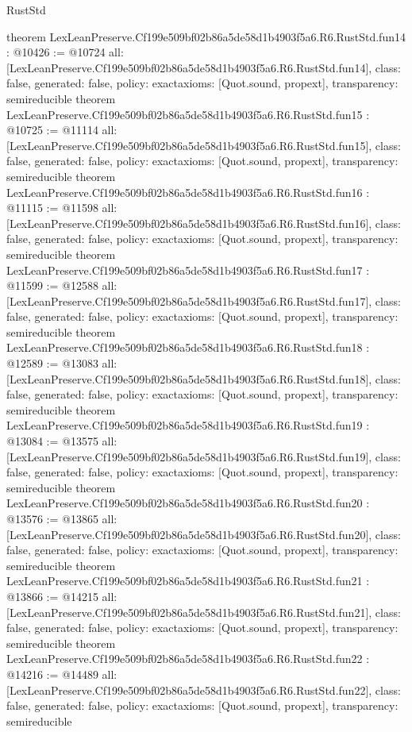 \begin{lexlean}{RustStd}
\begin{coremodule}
{}
theorem LexLeanPreserve.Cf199e509bf02b86a5de58d1b4903f5a6.R6.RustStd.fun14 : @10426 := @10724 {
  all: [LexLeanPreserve.Cf199e509bf02b86a5de58d1b4903f5a6.R6.RustStd.fun14],
  class: false,
  generated: false,
  policy: exact{axioms: [Quot.sound, propext]},
  transparency: semireducible
}
theorem LexLeanPreserve.Cf199e509bf02b86a5de58d1b4903f5a6.R6.RustStd.fun15 : @10725 := @11114 {
  all: [LexLeanPreserve.Cf199e509bf02b86a5de58d1b4903f5a6.R6.RustStd.fun15],
  class: false,
  generated: false,
  policy: exact{axioms: [Quot.sound, propext]},
  transparency: semireducible
}
theorem LexLeanPreserve.Cf199e509bf02b86a5de58d1b4903f5a6.R6.RustStd.fun16 : @11115 := @11598 {
  all: [LexLeanPreserve.Cf199e509bf02b86a5de58d1b4903f5a6.R6.RustStd.fun16],
  class: false,
  generated: false,
  policy: exact{axioms: [Quot.sound, propext]},
  transparency: semireducible
}
theorem LexLeanPreserve.Cf199e509bf02b86a5de58d1b4903f5a6.R6.RustStd.fun17 : @11599 := @12588 {
  all: [LexLeanPreserve.Cf199e509bf02b86a5de58d1b4903f5a6.R6.RustStd.fun17],
  class: false,
  generated: false,
  policy: exact{axioms: [Quot.sound, propext]},
  transparency: semireducible
}
theorem LexLeanPreserve.Cf199e509bf02b86a5de58d1b4903f5a6.R6.RustStd.fun18 : @12589 := @13083 {
  all: [LexLeanPreserve.Cf199e509bf02b86a5de58d1b4903f5a6.R6.RustStd.fun18],
  class: false,
  generated: false,
  policy: exact{axioms: [Quot.sound, propext]},
  transparency: semireducible
}
theorem LexLeanPreserve.Cf199e509bf02b86a5de58d1b4903f5a6.R6.RustStd.fun19 : @13084 := @13575 {
  all: [LexLeanPreserve.Cf199e509bf02b86a5de58d1b4903f5a6.R6.RustStd.fun19],
  class: false,
  generated: false,
  policy: exact{axioms: [Quot.sound, propext]},
  transparency: semireducible
}
theorem LexLeanPreserve.Cf199e509bf02b86a5de58d1b4903f5a6.R6.RustStd.fun20 : @13576 := @13865 {
  all: [LexLeanPreserve.Cf199e509bf02b86a5de58d1b4903f5a6.R6.RustStd.fun20],
  class: false,
  generated: false,
  policy: exact{axioms: [Quot.sound, propext]},
  transparency: semireducible
}
theorem LexLeanPreserve.Cf199e509bf02b86a5de58d1b4903f5a6.R6.RustStd.fun21 : @13866 := @14215 {
  all: [LexLeanPreserve.Cf199e509bf02b86a5de58d1b4903f5a6.R6.RustStd.fun21],
  class: false,
  generated: false,
  policy: exact{axioms: [Quot.sound, propext]},
  transparency: semireducible
}
theorem LexLeanPreserve.Cf199e509bf02b86a5de58d1b4903f5a6.R6.RustStd.fun22 : @14216 := @14489 {
  all: [LexLeanPreserve.Cf199e509bf02b86a5de58d1b4903f5a6.R6.RustStd.fun22],
  class: false,
  generated: false,
  policy: exact{axioms: [Quot.sound, propext]},
  transparency: semireducible
}
\end{coremodule}
\end{lexlean}

